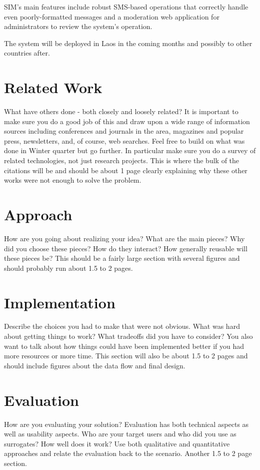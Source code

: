 \documentclass{acm_proc_article-sp}
\begin{document}
SIM's main features include robust SMS-based operations that correctly handle even poorly-formatted messages and a moderation web application for administrators to review the system's operation. 

The system will be deployed in Laos in the coming months and possibly to other countries after.

\section{Related Work}
What have others done - both closely and loosely related?  It is important to make sure you do a good job of this and draw upon a wide range of information sources including conferences and journals in the area, magazines and popular press, newsletters, and, of course, web searches.  Feel free to build on what was done in Winter quarter but go further.  In particular make sure you do a survey of related technologies, not just research projects.  This is where the bulk of the citations will be and should be about 1 page clearly explaining why these other works were not enough to solve the problem.

\section{Approach}
How are you going about realizing your idea?  What are the main pieces?  Why did you choose these pieces?  How do they interact?  How generally reusable will these pieces be?  This should be a fairly large section with several figures and should probably run about 1.5 to 2 pages.

\section{Implementation}
Describe the choices you had to make that were not obvious.  What was hard about getting things to work?  What tradeoffs did you have to consider?  You also want to talk about how things could have been implemented better if you had more resources or more time.  This section will also be about 1.5 to 2 pages and should include figures about the data flow and final design.

\section{Evaluation}
How are you evaluating your solution?  Evaluation has both technical aspects as well as usability aspects.  Who are your target users and who did you use as surrogates?  How well does it work?  Use both qualitative and quantitative approaches and relate the evaluation back to the scenario.  Another 1.5 to 2 page section.
\end{document}
